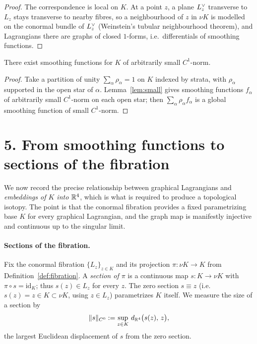 \begin{proof}
The correspondence is local on $K$. At a point $z$, a plane $L^{\vee}_z$ transverse
to $L_z$ stays transverse to nearby fibres, so a neighbourhood of $z$ in $\nu K$
is modelled on the conormal bundle of $L^{\vee}_z$ (Weinstein's tubular
neighbourhood theorem), and Lagrangians there are graphs of closed $1$-forms,
i.e.\ differentials of smoothing functions.
\end{proof}

\begin{qeightlemma}\label{lem:small-global}
There exist smoothing functions for $K$ of arbitrarily small $C^1$-norm.
\end{qeightlemma}

\begin{proof}
Take a partition of unity $\sum_\alpha\rho_\alpha=1$ on $K$ indexed by strata,
with $\rho_\alpha$ supported in the open star of $\alpha$. Lemma~\ref{lem:small}
gives smoothing functions $f_\alpha$ of arbitrarily small $C^1$-norm on each open
star; then $\sum_\alpha\rho_\alpha f_\alpha$ is a global smoothing function of
small $C^1$-norm.
\end{proof}

\section*{5. From smoothing functions to sections of the fibration}

We now record the precise relationship between graphical Lagrangians and
\emph{embeddings of $K$ into $\mathbb{R}^4$}, which is what is required to produce a
topological isotopy. The point is that the conormal fibration provides a fixed
parametrizing base $K$ for every graphical Lagrangian, and the graph map is
manifestly injective and continuous up to the singular limit.

\paragraph{Sections of the fibration.} Fix the conormal fibration $\{L_z\}_{z\in K}$
and its projection $\pi\colon\nu K\to K$ from
Definition~\ref{def:fibration}. A \emph{section of $\pi$} is a continuous map
$s\colon K\to\nu K$ with $\pi\circ s=\mathrm{id}_K$; thus $s(z)\in L_z$ for every
$z$. The zero section $s\equiv z$ (i.e.\ $s(z)=z\in K\subset\nu K$, using
$z\in L_z$) parametrizes $K$ itself. We measure the size of a section by
\[
\|s\|_{C^0}:=\sup_{z\in K}\,d_{\mathbb{R}^4}\bigl(s(z),\,z\bigr),
\]
the largest Euclidean displacement of $s$ from the zero section.

